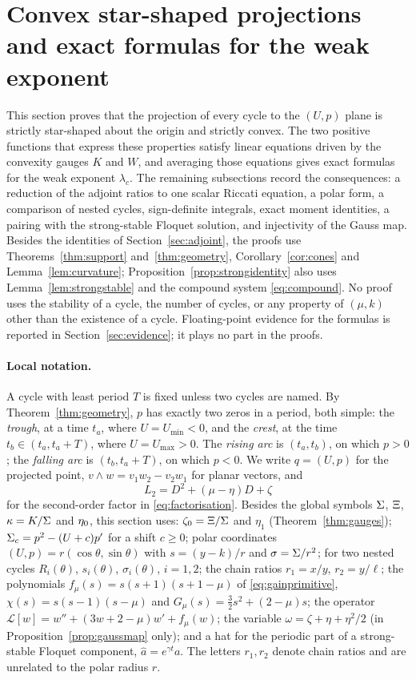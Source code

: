 \section{Convex star-shaped projections and exact formulas for the weak exponent}\label{sec:gauges}
This section proves that the projection of every cycle to the $(U,p)$ plane is strictly star-shaped about the origin and strictly convex. The two positive functions that express these properties satisfy linear equations driven by the convexity gauges $K$ and $W$, and averaging those equations gives exact formulas for the weak exponent $\lambda_c$. The remaining subsections record the consequences: a reduction of the adjoint ratios to one scalar Riccati equation, a polar form, a comparison of nested cycles, sign-definite integrals, exact moment identities, a pairing with the strong-stable Floquet solution, and injectivity of the Gauss map. Besides the identities of Section~\ref{sec:adjoint}, the proofs use Theorems~\ref{thm:support} and~\ref{thm:geometry}, Corollary~\ref{cor:cones} and Lemma~\ref{lem:curvature}; Proposition~\ref{prop:strongidentity} also uses Lemma~\ref{lem:strongstable} and the compound system \eqref{eq:compound}. No proof uses the stability of a cycle, the number of cycles, or any property of $(\mu,k)$ other than the existence of a cycle. Floating-point evidence for the formulas is reported in Section~\ref{sec:evidence}; it plays no part in the proofs.

\paragraph{Local notation.}
A cycle with least period $T$ is fixed unless two cycles are named. By Theorem~\ref{thm:geometry}, $p$ has exactly two zeros in a period, both simple: the \emph{trough}, at a time $t_a$, where $U=U_{\min}<0$, and the \emph{crest}, at the time $t_b\in(t_a,t_a+T)$, where $U=U_{\max}>0$. The \emph{rising arc} is $(t_a,t_b)$, on which $p>0$; the \emph{falling arc} is $(t_b,t_a+T)$, on which $p<0$. We write $q=(U,p)$ for the projected point, $v\wedge w=v_1w_2-v_2w_1$ for planar vectors, and
\[
L_2=D^2+(\mu-\eta)D+\zeta
\]
for the second-order factor in \eqref{eq:factorisation}. Besides the global symbols $\Sigma$, $\Xi$, $\kappa=K/\Sigma$ and $\eta_0$, this section uses: $\zeta_0=\Xi/\Sigma$ and $\eta_1$ (Theorem~\ref{thm:gauges}); $\Sigma_c=p^2-(U+c)p'$ for a shift $c\ge0$; polar coordinates $(U,p)=r(\cos\theta,\sin\theta)$ with $s=(y-k)/r$ and $\sigma=\Sigma/r^2$; for two nested cycles $R_i(\theta)$, $s_i(\theta)$, $\sigma_i(\theta)$, $i=1,2$; the chain ratios $r_1=x/y$, $r_2=y/\ell$; the polynomials $f_\mu(s)=s(s+1)(s+1-\mu)$ of \eqref{eq:gainprimitive}, $\chi(s)=s(s-1)(s-\mu)$ and $G_\mu(s)=\tfrac32s^2+(2-\mu)s$; the operator $\mathcal L[w]=w''+(3w+2-\mu)w'+f_\mu(w)$; the variable $\omega=\zeta+\eta+\eta^2/2$ (in Proposition~\ref{prop:gaussmap} only); and a hat for the periodic part of a strong-stable Floquet component, $\hat a=e^{\gamma t}a$. The letters $r_1,r_2$ denote chain ratios and are unrelated to the polar radius $r$.

